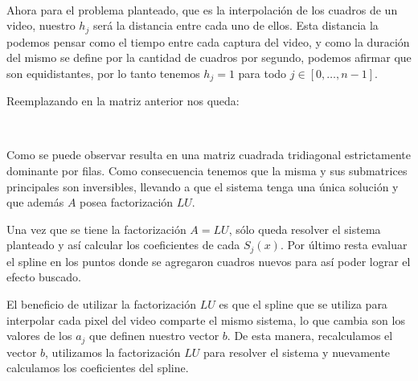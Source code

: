 ~

Ahora para el problema planteado, que es la interpolación de los cuadros de un
video, nuestro $h_j$ será la distancia entre cada uno de ellos. Esta distancia la
podemos pensar como el tiempo entre cada captura del video, y como la duración
del mismo se define por la cantidad de cuadros por segundo, podemos afirmar que
son equidistantes, por lo tanto tenemos $h_j = 1$ para todo $j \in [0, \dots,
n-1]$.

Reemplazando en la matriz anterior nos queda:

\setlength{\arraycolsep}{6pt}

~

Como se puede observar resulta en una matriz cuadrada tridiagonal estrictamente dominante
por filas. Como consecuencia tenemos que la misma y sus submatrices principales
son inversibles, llevando a que el sistema tenga una única solución y que además
$A$ posea factorización $LU$.

Una vez que se tiene la factorización $A = LU$, sólo queda resolver el sistema
planteado y así calcular los coeficientes de cada $S_j(x)$. Por último resta
evaluar el spline en los puntos donde se agregaron cuadros nuevos para así poder
lograr el efecto buscado.

El beneficio de utilizar la factorización $LU$ es que el spline que se utiliza
para interpolar cada pixel del video comparte el mismo sistema, lo que cambia
son los valores de los $a_j$ que definen nuestro vector $b$. De esta manera,
recalculamos el vector $b$, utilizamos la factorización $LU$ para resolver el
sistema y nuevamente calculamos los coeficientes del spline.

